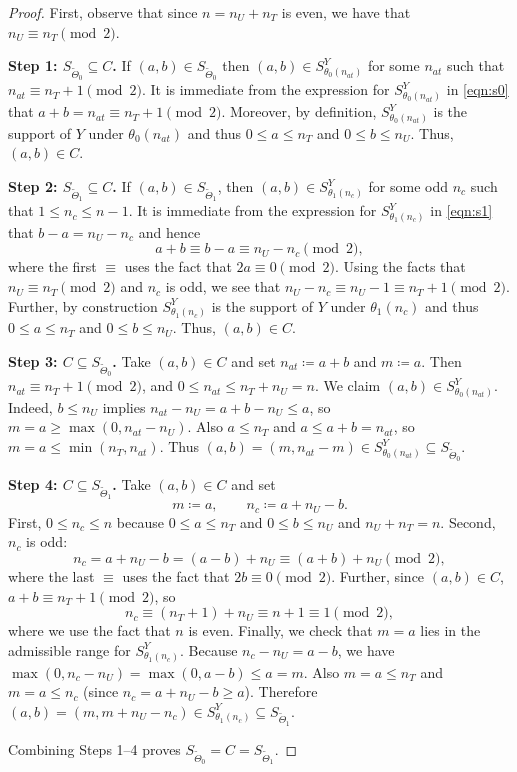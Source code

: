 \documentclass[12pt,reqno]{amsart}
\begin{document}
\begin{proof}
First, observe that since $n = n_U + n_T$ is even, we have that $n_U\equiv n_T\pmod 2$. 

\textbf{Step 1: $S_{\tilde{\Theta}_0} \subseteq C$.}
If $(a,b) \in S_{\tilde{\Theta}_0}$ then $(a,b)\in S^Y_{\theta_0(n_{at})}$ for some $n_{at}$ such that $n_{at}\equiv n_T+1\pmod 2$. It is immediate from the expression for $S^Y_{\theta_0(n_{at})}$ in \eqref{eqn:s0} that $a+b=n_{at} \equiv n_T+1 \pmod 2$. Moreover, by definition, $S^Y_{\theta_0(n_{at})}$ is the support of $Y$ under $\theta_0(n_{at})$ and thus $0 \leq a \leq n_T$ and $0 \leq b \leq n_U$. Thus, $(a,b)\in C$.

\medskip
\textbf{Step 2: $S_{\tilde{\Theta}_1} \subseteq C$.}
If $(a,b) \in S_{\tilde{\Theta}_1}$, then $(a,b)\in S^Y_{\theta_1(n_c)}$ for some odd $n_c$ such that $1 \leq n_c \leq n - 1$. It is immediate from the expression for $S^Y_{\theta_1(n_c)}$ in \eqref{eqn:s1} that $b-a=n_U-n_c$ and hence
\[
a+b\equiv b-a\equiv n_U-n_c \pmod 2,
\]
where the first $\equiv$ uses the fact that $2a \equiv 0 \pmod2$. Using the facts that $n_U\equiv n_T\pmod 2$ and $n_c$ is odd, we see that $n_U-n_c\equiv n_U-1\equiv n_T+1\pmod 2$. Further, by construction $S^Y_{\theta_1(n_c)}$ is the support of $Y$ under $\theta_1(n_c)$ and thus $0 \leq a \leq n_T$ and $0 \leq b \leq n_U$. Thus, $(a,b)\in C$.

\medskip
\textbf{Step 3: $C\subseteq S_{\tilde{\Theta}_0}$.}
Take $(a,b)\in C$ and set $n_{at}\coloneqq a+b$ and $m\coloneqq a$.
Then $n_{at}\equiv n_T+1\pmod 2$, and $0\le n_{at}\le n_T+n_U=n$.
We claim $(a,b)\in S^Y_{\theta_0(n_{at})}$.
Indeed, $b\le n_U$ implies $n_{at}-n_U=a+b-n_U\le a$, so $m=a\ge \max(0,n_{at}-n_U)$.
Also $a\le n_T$ and $a\le a+b = n_{at}$, so $m=a\le \min(n_T,n_{at})$.
Thus $(a,b)=(m,n_{at}-m)\in S^Y_{\theta_0(n_{at})}\subseteq S_{\tilde{\Theta}_0}$.

\medskip
\textbf{Step 4: $C\subseteq S_{\tilde{\Theta}_1}$.}
Take $(a,b)\in C$ and set
\[
 m\coloneqq a,\qquad n_c\coloneqq a+n_U-b.
\]
First, $0\le n_c\le n$ because $0\le a\le n_T$ and $0\le b\le n_U$ and $n_U + n_T =n$.
Second, $n_c$ is odd:
\[
 n_c =  a+n_U-b = (a-b)+n_U\equiv (a+b)+n_U\pmod 2,
\]
where the last $\equiv$ uses the fact that $2b \equiv 0 \pmod 2$. Further, since $(a,b)\in C$, $a+b\equiv n_T+1\pmod 2$, so
\[
 n_c\equiv (n_T+1)+n_U \equiv n+1 \equiv 1\pmod 2,
\]
where we use the fact that $n$ is even. Finally, we check that $m=a$ lies in the admissible range for $S^Y_{\theta_1(n_c)}$.
Because $n_c-n_U=a-b$, we have $\max(0,n_c-n_U)=\max(0,a-b)\le a=m$.
Also $m=a\le n_T$ and $m=a\le n_c$ (since $n_c=a+n_U-b\ge a$).
Therefore $(a,b)=(m, m+n_U-n_c)\in S^Y_{\theta_1(n_c)}\subseteq S_{\tilde{\Theta}_1}$.

Combining Steps 1--4 proves $S_{\tilde{\Theta}_0}=C=S_{\tilde{\Theta}_1}$.
\end{proof}
\end{document}
